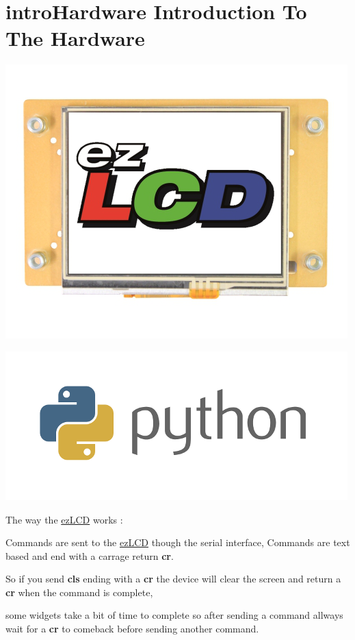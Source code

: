 \hypertarget{group__mainpage}{\section{intro\-Hardware Introduction To The Hardware}
\label{group__mainpage}
}
  
\begin{DoxyImageNoCaption}
  \mbox{\includegraphics{ezLCD-303Front.png}}
\end{DoxyImageNoCaption}
 
\begin{DoxyImageNoCaption}
  \mbox{\includegraphics{python.png}}
\end{DoxyImageNoCaption}


The way the \hyperlink{classez_l_c_d3xx_1_1ez_l_c_d}{ez\-L\-C\-D} works \-:\par
 Commands are sent to the \hyperlink{classez_l_c_d3xx_1_1ez_l_c_d}{ez\-L\-C\-D} though the serial interface, Commands are text based and end with a carrage return {\bfseries cr}.\par
 So if you send {\bfseries cls} ending with a {\bfseries cr} the device will clear the screen and return a {\bfseries cr} when the command is complete,\par
 some widgets take a bit of time to complete so after sending a command allways wait for a {\bfseries cr} to comeback before sending another command.\par
 